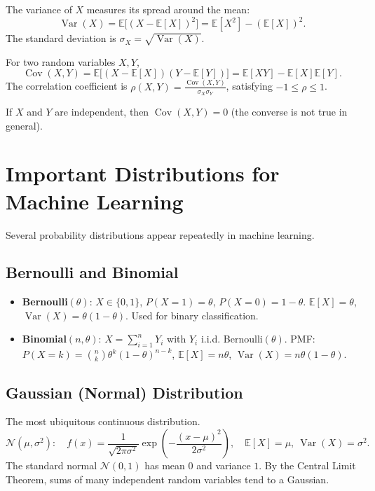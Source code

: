 \documentclass{tufte-handout}
\begin{document}
\begin{defn}[Variance]
    The variance of $X$ measures its spread around the mean:
    \[
    \operatorname{Var}(X) = \mathbb{E}\bigl[(X - \mathbb{E}[X])^2\bigr] = \mathbb{E}[X^2] - (\mathbb{E}[X])^2.
    \]
    The standard deviation is $\sigma_X = \sqrt{\operatorname{Var}(X)}$.
\end{defn}

\begin{defn}
    For two random variables $X,Y$,
    \[
    \operatorname{Cov}(X,Y) = \mathbb{E}\bigl[(X - \mathbb{E}[X])(Y - \mathbb{E}[Y])\bigr] = \mathbb{E}[XY] - \mathbb{E}[X]\mathbb{E}[Y].
    \]
    The correlation coefficient is $\rho(X,Y) = \frac{\operatorname{Cov}(X,Y)}{\sigma_X \sigma_Y}$, satisfying $-1 \le \rho \le 1$.
\end{defn}

If $X$ and $Y$ are independent, then $\operatorname{Cov}(X,Y)=0$ (the converse is not true in general).

\section{Important Distributions for Machine Learning}

Several probability distributions appear repeatedly in machine learning.

\subsection{Bernoulli and Binomial}
\begin{itemize}
    \item \textbf{Bernoulli}$(\theta)$: $X \in \{0,1\}$, $P(X=1)=\theta$, $P(X=0)=1-\theta$. $\mathbb{E}[X]=\theta$, $\operatorname{Var}(X)=\theta(1-\theta)$. Used for binary classification.
    \item \textbf{Binomial}$(n,\theta)$: $X = \sum_{i=1}^n Y_i$ with $Y_i$ i.i.d. Bernoulli$(\theta)$. PMF: $P(X=k) = \binom{n}{k}\theta^k(1-\theta)^{n-k}$, $\mathbb{E}[X]=n\theta$, $\operatorname{Var}(X)=n\theta(1-\theta)$.
\end{itemize}

\subsection{Gaussian (Normal) Distribution}
The most ubiquitous continuous distribution.
\[
\mathcal{N}(\mu, \sigma^2):\quad f(x) = \frac{1}{\sqrt{2\pi\sigma^2}} \exp\!\left(-\frac{(x-\mu)^2}{2\sigma^2}\right),\quad \mathbb{E}[X]=\mu,\ \operatorname{Var}(X)=\sigma^2.
\]
The standard normal $\mathcal{N}(0,1)$ has mean $0$ and variance $1$. By the Central Limit Theorem, sums of many independent random variables tend to a Gaussian.
\end{document}
